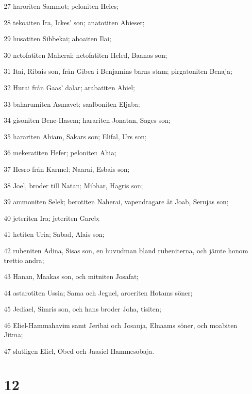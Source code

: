 \par 27 haroriten Sammot; peloniten Heles;
\par 28 tekoaiten Ira, Ickes' son; anatotiten Abieser;
\par 29 husatiten Sibbekai; ahoaiten Ilai;
\par 30 netofatiten Maherai; netofatiten Heled, Baanas son;
\par 31 Itai, Ribais son, från Gibea i Benjamins barns stam; pirgatoniten Benaja;
\par 32 Hurai från Gaas' dalar; arabatiten Abiel;
\par 33 baharumiten Asmavet; saalboniten Eljaba;
\par 34 gisoniten Bene-Hasem; harariten Jonatan, Sages son;
\par 35 harariten Ahiam, Sakars son; Elifal, Urs son;
\par 36 mekeratiten Hefer; peloniten Ahia;
\par 37 Hesro från Karmel; Naarai, Esbais son;
\par 38 Joel, broder till Natan; Mibhar, Hagris son;
\par 39 ammoniten Selek; berotiten Naherai, vapendragare åt Joab, Serujas son;
\par 40 jeteriten Ira; jeteriten Gareb;
\par 41 hetiten Uria; Sabad, Alais son;
\par 42 rubeniten Adina, Sisas son, en huvudman bland rubeniterna, och jämte honom trettio andra;
\par 43 Hanan, Maakas son, och mitniten Josafat;
\par 44 astarotiten Ussia; Sama och Jeguel, aroeriten Hotams söner;
\par 45 Jediael, Simris son, och hans broder Joha, tisiten;
\par 46 Eliel-Hammahavim samt Jeribai och Josauja, Elnaams söner, och moabiten Jitma;
\par 47 slutligen Eliel, Obed och Jaasiel-Hammesobaja.

\chapter{12}

